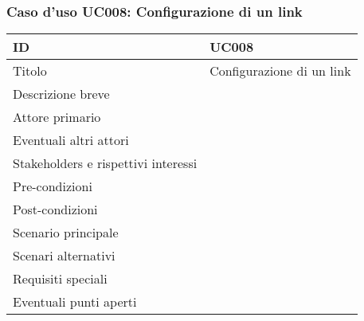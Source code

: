 \documentclass[../../main.tex]{subfiles}
\begin{document}
\subsubsection{Caso d’uso UC008: Configurazione di un link }
\begin{tabularx}{150mm}{|l|X|}
    \hline
    ID                                  & \textbf{UC008}\\
    \hline
    Titolo                              & Configurazione di un link \\
    \hline
    Descrizione breve                   &    \\
    \hline
    Attore primario                     &    \\
    \hline
    Eventuali altri attori              &    \\
    \hline
    Stakeholders e rispettivi interessi &    \\
    \hline
    Pre-condizioni                      &    \\
    \hline
    Post-condizioni                     &    \\
    \hline
    Scenario principale                 &    \\
    \hline
    Scenari alternativi                 &    \\
    \hline
    Requisiti speciali                  &    \\
    \hline
    Eventuali punti aperti              &    \\
    \hline
\end{tabularx}
\newpage
\end{document}
